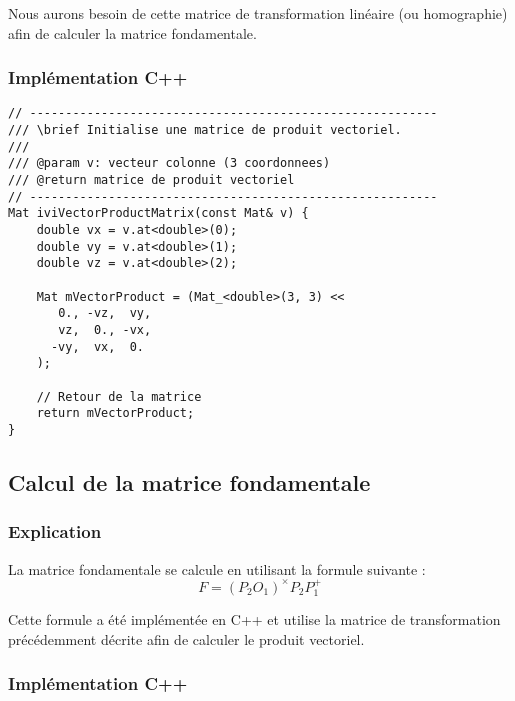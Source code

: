 \documentclass[a4paper]{article}
\begin{document}
Nous aurons besoin de cette matrice de transformation linéaire (ou homographie) afin de calculer la matrice fondamentale.

\subsubsection{Implémentation C++}
\label{subs:Implémentation C++}

\begin{lstlisting}
// ---------------------------------------------------------
/// \brief Initialise une matrice de produit vectoriel.
///
/// @param v: vecteur colonne (3 coordonnees)
/// @return matrice de produit vectoriel
// ---------------------------------------------------------
Mat iviVectorProductMatrix(const Mat& v) {
    double vx = v.at<double>(0);
    double vy = v.at<double>(1);
    double vz = v.at<double>(2);

    Mat mVectorProduct = (Mat_<double>(3, 3) <<
       0., -vz,  vy,
       vz,  0., -vx,
      -vy,  vx,  0.
    );

    // Retour de la matrice
    return mVectorProduct;
}
\end{lstlisting}

\clearpage
\subsection{Calcul de la matrice fondamentale}

\subsubsection{Explication}
\label{subs:Explication}

La matrice fondamentale se calcule en utilisant la formule suivante :
\begin{equation}
  F = (P_2O_1) ^\times P_2P_1^+
\end{equation}

Cette formule a été implémentée en C++ et utilise la matrice de transformation précédemment décrite afin de calculer le produit vectoriel.

\subsubsection{Implémentation C++}
\label{subs:Implémentation C++}
\end{document}
